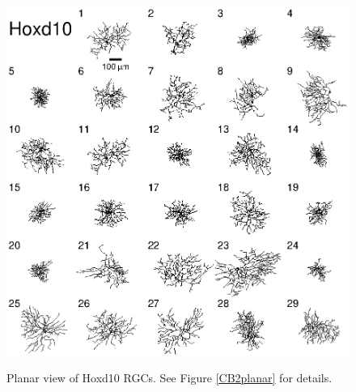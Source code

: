 \documentclass{article}
\begin{document}
\begin{figure}
  \centering
  {\includegraphics[scale=1.5]{Figures/SupFig1/Hoxd10-all-cells-1.eps}}
  \caption{Planar view of Hoxd10 RGCs. See Figure \ref{CB2planar} for details.}
\end{figure}
\end{document}
